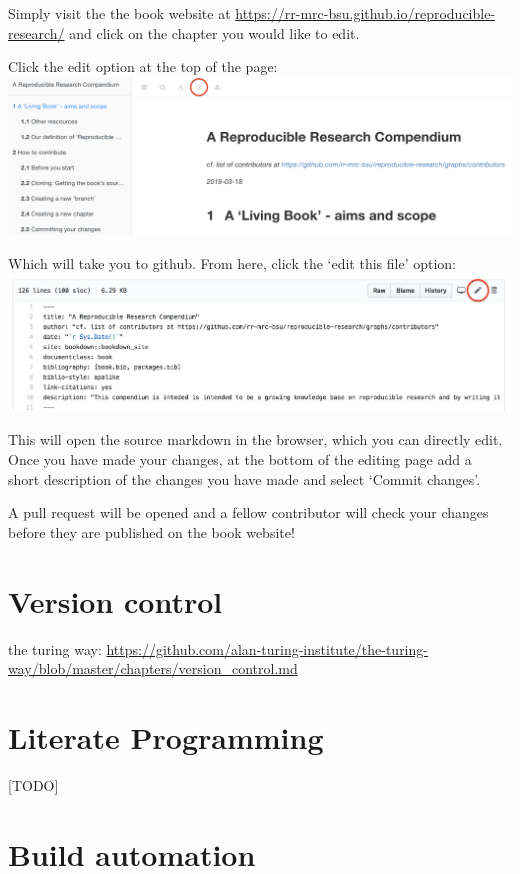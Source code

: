 \documentclass[]{book}
\begin{document}
Simply visit the the book website at
\url{https://rr-mrc-bsu.github.io/reproducible-research/} and click on
the chapter you would like to edit.

Click the edit option at the top of the page:
\includegraphics{Figures/alternative1.png}

Which will take you to github. From here, click the `edit this file'
option: \includegraphics{Figures/alternative2.png}

This will open the source markdown in the browser, which you can
directly edit. Once you have made your changes, at the bottom of the
editing page add a\\
short description of the changes you have made and select `Commit
changes'.

A pull request will be opened and a fellow contributor will check your
changes\\
before they are published on the book website!

\chapter{Version control}\label{chptr-version-control}

the turing way:
\url{https://github.com/alan-turing-institute/the-turing-way/blob/master/chapters/version_control.md}

\chapter{Literate Programming}\label{chptr-literate-programming}

{[}TODO{]}

\chapter{Build automation}\label{chptr-workflow-automation}
\end{document}
